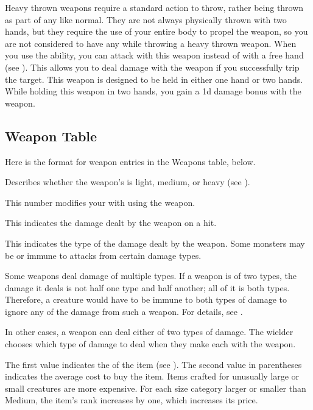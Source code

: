         Heavy thrown weapons require a standard action to throw, rather being thrown as part of any  like normal.
        They are not always physically thrown with two hands, but they require the use of your entire body to propel the weapon, so you are not considered to have any  while throwing a heavy thrown weapon.
         When you use the  ability, you can attack with this weapon instead of with a free hand (see ).
        This allows you to deal damage with the weapon if you successfully trip the target.
         This weapon is designed to be held in either one hand or two hands.
        While holding this weapon in two hands, you gain a \plus1d damage bonus with the weapon.

    \subsection{Weapon Table}
        Here is the format for weapon entries in the Weapons table, below.

         Describes whether the weapon's  is light, medium, or heavy (see ).

         This number modifies your  with  using the weapon.

         This  indicates the damage dealt by the weapon on a hit.

         This indicates the type of the damage dealt by the weapon.
        Some monsters may be  or immune to attacks from certain damage types.

        Some weapons deal damage of multiple types. If a weapon is of two types, the damage it deals is not half one type and half another; all of it is both types.
        Therefore, a creature would have to be immune to both types of damage to ignore any of the damage from such a weapon.
        For details, see .

        In other cases, a weapon can deal either of two types of damage.
        The wielder chooses which type of damage to deal when they make each  with the weapon.

         The first value indicates the  of the item (see ).
        The second value in parentheses indicates the average cost to buy the item.
        Items crafted for unusually large or small creatures are more expensive.
        For each size category larger or smaller than Medium, the item's rank increases by one, which increases its price.

